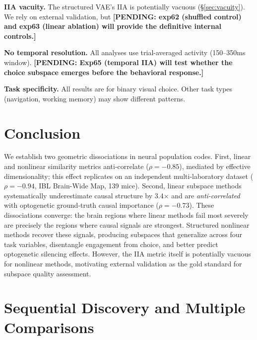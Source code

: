 \documentclass{article}
\newcommand{\pending}[1]{\textcolor{red!70!black}{\textbf{[PENDING: #1]}}}
\begin{document}
\textbf{IIA vacuity.} The structured VAE's IIA is potentially vacuous (\S\ref{sec:vacuity}). We rely on external validation, but \pending{exp62 (shuffled control) and exp63 (linear ablation) will provide the definitive internal controls.}

\textbf{No temporal resolution.} All analyses use trial-averaged activity (150--350ms window). \pending{Exp65 (temporal IIA) will test whether the choice subspace emerges before the behavioral response.}

\textbf{Task specificity.} All results are for binary visual choice. Other task types (navigation, working memory) may show different patterns.

\section{Conclusion}

We establish two geometric dissociations in neural population codes. First, linear and nonlinear similarity metrics anti-correlate ($\rho = -0.85$), mediated by effective dimensionality; this effect replicates on an independent multi-laboratory dataset ($\rho = -0.94$, IBL Brain-Wide Map, 139 mice). Second, linear subspace methods systematically underestimate causal structure by 3.4$\times$ and are \emph{anti-correlated} with optogenetic ground-truth causal importance ($\rho = -0.73$). These dissociations converge: the brain regions where linear methods fail most severely are precisely the regions where causal signals are strongest. Structured nonlinear methods recover these signals, producing subspaces that generalize across four task variables, disentangle engagement from choice, and better predict optogenetic silencing effects. However, the IIA metric itself is potentially vacuous for nonlinear methods, motivating external validation as the gold standard for subspace quality assessment.




\appendix
\section{Sequential Discovery and Multiple Comparisons}
\label{app:sequential}
\end{document}
